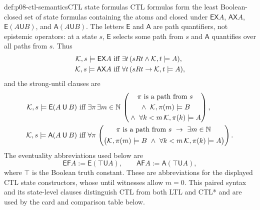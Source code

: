 \begin{hbdefinition}{def:p08-ctl-semantics}{CTL state formulas}
CTL formulas form the least Boolean-closed set of state formulas containing
the atoms and closed under
\(\mathsf{EX}A\), \(\mathsf{AX}A\),
\(\mathsf E(A\mathbin{\mathsf U}B)\), and
\(\mathsf A(A\mathbin{\mathsf U}B)\).  The letters \(\mathsf E\) and
\(\mathsf A\) are path quantifiers, not epistemic operators: at a state \(s\),
\(\mathsf E\) selects some path from \(s\) and \(\mathsf A\) quantifies over
all paths from \(s\).  Thus
\[
\begin{aligned}
 \mathcal K,s\models\mathsf{EX}A
 &\text{ iff }
   \exists t\,(sRt\land\mathcal K,t\models A),\\
 \mathcal K,s\models\mathsf{AX}A
 &\text{ iff }
   \forall t\,(sRt\to\mathcal K,t\models A),
\end{aligned}
\]
 and the strong-until clauses are
 \[
 \begin{aligned}
  \mathcal K,s\models\mathsf E(A\mathbin{\mathsf U}B)
  &\text{ iff }
    \exists\pi\,\exists m\in\mathbb N\,
    \left(
      \begin{gathered}
        \pi\text{ is a path from }s\\
        {}\land\ \mathcal K,\pi(m)\models B\\
        {}\land\ \forall k<m\,\mathcal K,\pi(k)\models A
      \end{gathered}
    \right),\\
  \mathcal K,s\models\mathsf A(A\mathbin{\mathsf U}B)
  &\text{ iff }
    \forall\pi\,
    \left(
      \begin{gathered}
        \pi\text{ is a path from }s\ \to\ \exists m\in\mathbb N\,\\
        \bigl(\mathcal K,\pi(m)\models B\ \land\
          \forall k<m\,\mathcal K,\pi(k)\models A\bigr)
      \end{gathered}
    \right).
 \end{aligned}
 \]
 The eventuality abbreviations used below are
 \[
  \mathsf{EF}A:=\mathsf E(\top\mathbin{\mathsf U}A),
  \qquad
  \mathsf{AF}A:=\mathsf A(\top\mathbin{\mathsf U}A),
 \]
 where \(\top\) is the Boolean truth constant.  These are abbreviations
 for the displayed CTL state constructors, whose until witnesses allow
 \(m=0\).
 This paired syntax and its state-level clauses distinguish CTL from both LTL
 and CTL* and are used by the card and comparison table below.
\end{hbdefinition}

